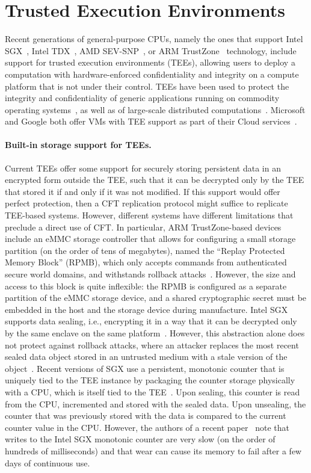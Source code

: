 \section{Trusted Execution Environments}
Recent generations of general-purpose CPUs, namely the ones that
support Intel SGX~\cite{intelsgx}, Intel TDX~\cite{inteltdx}, AMD
SEV-SNP~\cite{amdsev,amdsev-snp}, or ARM TrustZone~\cite{armTZ}
technology, include support for trusted execution environments (TEEs),
allowing users to deploy a computation with hardware-enforced
confidentiality and integrity on a compute platform that is not under
their control.  TEEs have been used to protect the integrity and
confidentiality of generic applications running on commodity operating
systems~\cite{haven}, as well as of large-scale distributed
computations~\cite{vc3}. Microsoft and Google both offer VMs with TEE
support as part of their Cloud
services~\cite{azure-conf,google-confVM}.

\paragraph{Built-in storage support for TEEs.}
Current TEEs offer some support for securely storing persistent
data in an encrypted form outside the TEE, such that it can be
decrypted only by the TEE that stored it if and only if it was not
modified. If this support would offer perfect protection, then a
CFT replication protocol might suffice to replicate TEE-based
systems. However, different systems have different limitations
that preclude a direct use of CFT.  In particular, ARM
TrustZone-based devices include an eMMC storage controller that
allows for configuring a small storage partition (on the order of
tens of megabytes), named the ``Replay Protected Memory Block''
(RPMB), which only accepts commands from authenticated secure
world domains, and withstands rollback attacks~\cite{rpmb}.
However, the size and access to this block is quite inflexible:
the RPMB is configured as a separate partition of the eMMC
storage device, and a shared cryptographic secret must be
embedded in the host and the storage device during manufacture.
Intel SGX supports data sealing, i.e., encrypting it in a way
that it can be decrypted only by the same enclave on the same
platform~\cite{intelsgx}. However, this abstraction alone does
not protect against rollback attacks, where an attacker replaces
the most recent sealed data object stored in an untrusted medium
with a stale version of the object~\cite{memoir}. Recent versions
of SGX use a persistent, monotonic counter that is uniquely tied
to the TEE instance by packaging the counter storage physically
with a CPU, which is itself tied to the TEE~\cite{intelsgx}. Upon
sealing, this counter is read from the CPU, incremented and
stored with the sealed data. Upon unsealing, the counter that was
previously stored with the data is compared to the current
counter value in the CPU. However, the authors of a recent
paper~\cite{rote} note that writes to the Intel SGX monotonic
counter are very slow (on the order of hundreds of milliseconds)
and that wear can cause its memory to fail after a few days of
continuous use.

